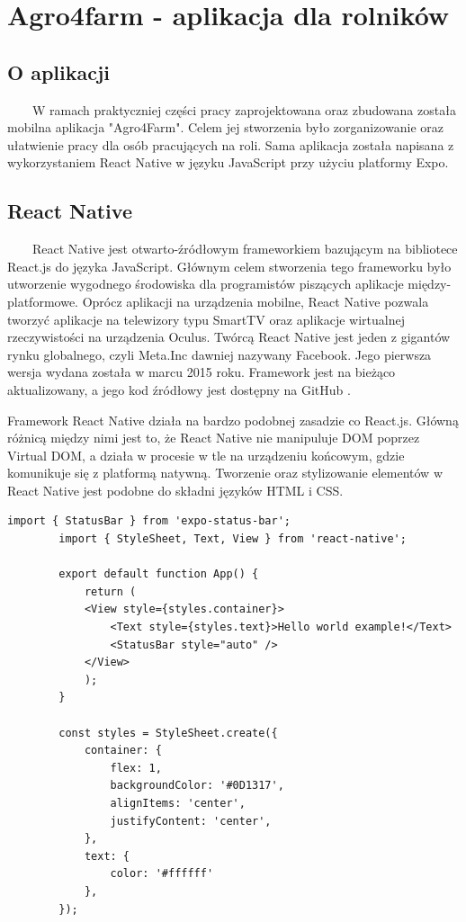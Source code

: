 \documentclass[a4paper,12pt,oneside]{book}
\begin{document}
	\newpage
	\chapter{Agro4farm - aplikacja dla rolników}
	
	\section{O aplikacji}
	\ \ \ \
	W ramach praktyczniej części pracy zaprojektowana oraz zbudowana została mobilna aplikacja "Agro4Farm". Celem jej stworzenia było zorganizowanie oraz ułatwienie pracy dla osób pracujących na roli. Sama aplikacja została napisana z wykorzystaniem React Native w języku JavaScript przy użyciu platformy Expo.
	
	\section{React Native}
	\ \ \ \
	React Native jest otwarto-źródłowym frameworkiem bazującym na bibliotece React.js do języka JavaScript. Głównym celem stworzenia tego frameworku było utworzenie wygodnego środowiska dla programistów piszących aplikacje między-platformowe. Oprócz aplikacji na urządzenia mobilne, React Native pozwala tworzyć aplikacje na telewizory typu SmartTV oraz aplikacje wirtualnej rzeczywistości na urządzenia Oculus. Twórcą React Native jest jeden z gigantów rynku globalnego, czyli Meta.Inc dawniej nazywany Facebook. Jego pierwsza wersja wydana została w marcu 2015 roku. Framework jest na bieżąco aktualizowany, a jego kod źródłowy jest dostępny na GitHub \cite{ref9}.
	
	\newpage
	
	Framework React Native działa na bardzo podobnej zasadzie co React.js. Główną różnicą między nimi jest to, że React Native nie manipuluje DOM poprzez Virtual DOM, a działa w procesie w tle na urządzeniu końcowym, gdzie komunikuje się z platformą natywną. Tworzenie oraz stylizowanie elementów w React Native jest podobne do składni języków HTML i CSS.
	
	\begin{lstlisting}[caption=Kod przykłądowej aplikacji "Hello world" w React Native]
		import { StatusBar } from 'expo-status-bar';
		import { StyleSheet, Text, View } from 'react-native';
		
		export default function App() {
			return (
			<View style={styles.container}>
				<Text style={styles.text}>Hello world example!</Text>
				<StatusBar style="auto" />
			</View>
			);
		}
		
		const styles = StyleSheet.create({
			container: {
				flex: 1,
				backgroundColor: '#0D1317',
				alignItems: 'center',
				justifyContent: 'center',
			},
			text: {
				color: '#ffffff'
			},
		});
	\end{lstlisting}
\end{document}
